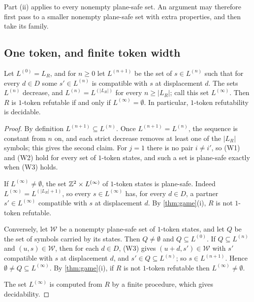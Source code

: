 Part (ii) applies to every nonempty plane-safe set. An argument may therefore first pass to a smaller nonempty plane-safe set with extra properties, and then take its family.

\subsection{One token, and finite token width}\label{set:sub-width}

\begin{proposition}\label{set:one-token}
Let $L^{(0)}=L_R$, and for $n\ge0$ let $L^{(n+1)}$ be the set of $s\in L^{(n)}$ such that for every $d\in D$ some $s'\in L^{(n)}$ is compatible with $s$ at displacement $d$. The sets $L^{(n)}$ decrease, and $L^{(n)}=L^{(|L_R|)}$ for every $n\ge|L_R|$; call this set $L^{(\infty)}$. Then $R$ is $1$-token refutable if and only if $L^{(\infty)}=\emptyset$. In particular, $1$-token refutability is decidable.
\end{proposition}

\begin{proof}
By definition $L^{(n+1)}\subseteq L^{(n)}$. Once $L^{(n+1)}=L^{(n)}$, the sequence is constant from $n$ on, and each strict decrease removes at least one of the $|L_R|$ symbols; this gives the second claim. For $j=1$ there is no pair $i\ne i'$, so (W1) and (W2) hold for every set of $1$-token states, and such a set is plane-safe exactly when (W3) holds.

If $L^{(\infty)}\ne\emptyset$, the set $\mathbb{Z}^2\times L^{(\infty)}$ of $1$-token states is plane-safe. Indeed $L^{(\infty)}=L^{(|L_R|+1)}$, so every $s\in L^{(\infty)}$ has, for every $d\in D$, a partner $s'\in L^{(\infty)}$ compatible with $s$ at displacement $d$. By \cref{thm:game}(i), $R$ is not $1$-token refutable.

Conversely, let $\mathcal W$ be a nonempty plane-safe set of $1$-token states, and let $Q$ be the set of symbols carried by its states. Then $Q\ne\emptyset$ and $Q\subseteq L^{(0)}$. If $Q\subseteq L^{(n)}$ and $(u,s)\in\mathcal W$, then for each $d\in D$, (W3) gives $(u+d,s')\in\mathcal W$ with $s'$ compatible with $s$ at displacement $d$, and $s'\in Q\subseteq L^{(n)}$; so $s\in L^{(n+1)}$. Hence $\emptyset\ne Q\subseteq L^{(\infty)}$. By \cref{thm:game}(i), if $R$ is not $1$-token refutable then $L^{(\infty)}\ne\emptyset$.

The set $L^{(\infty)}$ is computed from $R$ by a finite procedure, which gives decidability.
\end{proof}

